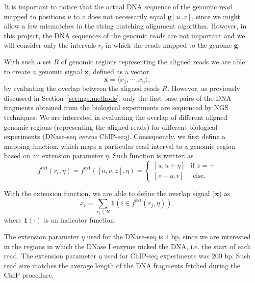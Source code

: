 It is important to notice that the actual DNA sequence of the genomic read mapped to positions $u$ to $v$ does not necessarily equal $\mathbf{g}[u..v]$, since we might allow a few mismatches in the string matching alignment algorithm. However, in this project, the DNA sequences of the genomic reads are not important and we will consider only the intervals ${r}_{i}$ in which the reads mapped to the genome $\mathbf{g}$.

With such a set $R$ of genomic regions representing the aligned reads we are able to create a genomic signal $\mathbf{x}$, defined as a vector
\begin{equation}
  \label{eq:raw.signal}
  \mathbf{x} = \langle {x}_{1}, \cdots, {x}_{n} \rangle,
\end{equation}
by evaluating the overlap between the aligned reads $R$. However, as previously discussed in Section~\ref{sec:ngs.methods}, only the first base pairs of the DNA fragments obtained from the biological experiments are sequenced by NGS techniques. We are interested in evaluating the overlap of different aligned genomic regions (representing the aligned reads) for different biological experiments (DNase-seq \emph{versus} ChIP-seq). Consequently, we first define a mapping function, which maps a particular read interval to a genomic region based on an extension parameter $\eta$. Such function is written as
\begin{equation}
  \label{eq:raw.signal.extension}
  {f}^{\text{ext}}({r}_{i}, \eta) = {f}^{\text{ext}}([u, v, z], \eta) =
  \begin{cases}
    [u,u+\eta] & \text{if } z = + \\
    [v-\eta,v] & \text{ else.}
  \end{cases}
\end{equation}

With the extension function, we are able to define the overlap signal ($\mathbf{x}$) as
\begin{equation}
  \label{eq:raw.signal.overlap}
  {x}_{i} = \sum_{{r}_{j} \in R} \mathbf{1}\left( i \in {f}^{\text{ext}}({r}_{j}, \eta) \right),
\end{equation}
where ${\mathbf{1}}(\cdot)$ is an indicator function.

The extension parameter $\eta$ used for the DNase-seq is $1$ bp, since we are interested in the regions in which the DNase I enzyme nicked the DNA, i.e. the start of each read. The extension parameter $\eta$ used for ChIP-seq experiments was $200$ bp. Such read size matches the average length of the DNA fragments fetched during the ChIP procedure.

